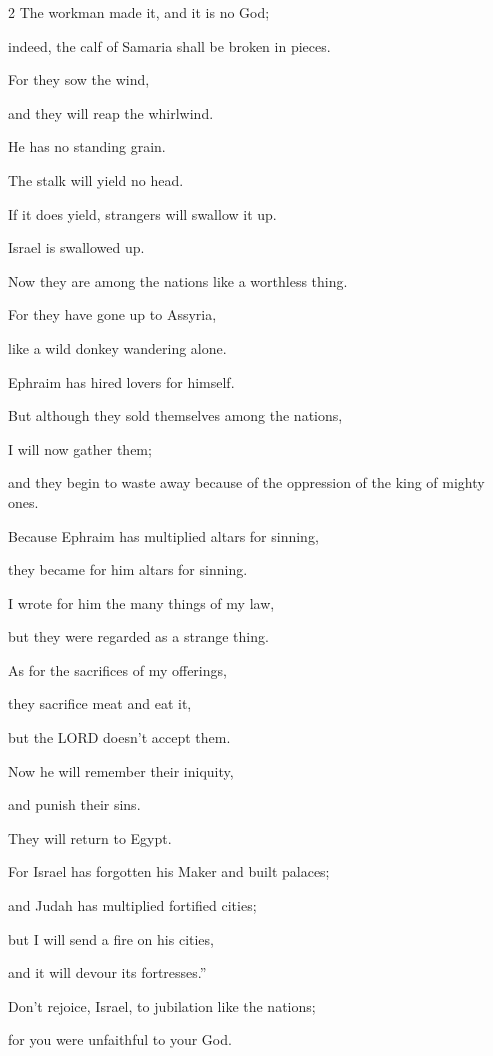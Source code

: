 \begin{multicols}{2}
The workman made it, and it is no God;

indeed, the calf of Samaria shall be broken in pieces.

\myverse{}For they sow the wind,

and they will reap the whirlwind.

He has no standing grain.

The stalk will yield no head.

If it does yield, strangers will swallow it up.

\myverse{}Israel is swallowed up.

Now they are among the nations like a worthless thing.

\myverse{}For they have gone up to Assyria,

like a wild donkey wandering alone.

Ephraim has hired lovers for himself.

\myverse{}But although they sold themselves among the nations,

I will now gather them;

and they begin to waste away because of the oppression of the king of mighty ones.

\myverse{}Because Ephraim has multiplied altars for sinning,

they became for him altars for sinning.

\myverse{}I wrote for him the many things of my law,

but they were regarded as a strange thing.

\myverse{}As for the sacrifices of my offerings,

they sacrifice meat and eat it,

but the LORD doesn’t accept them.

Now he will remember their iniquity,

and punish their sins.

They will return to Egypt.

\myverse{}For Israel has forgotten his Maker and built palaces;

and Judah has multiplied fortified cities;

but I will send a fire on his cities,

and it will devour its fortresses.”


\mychapter{} \myverse*{}Don’t rejoice, Israel, to jubilation like the nations;

for you were unfaithful to your God.


\end{multicols}
